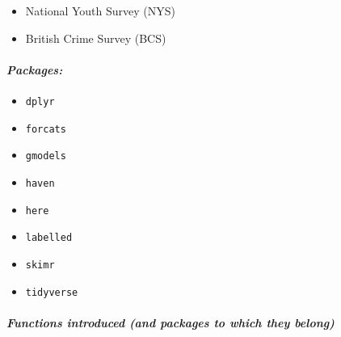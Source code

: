 \documentclass[
]{book}
\providecommand{\tightlist}{%
  \setlength{\itemsep}{0pt}\setlength{\parskip}{0pt}}
\begin{document}
\begin{itemize}
\tightlist
\item
  National Youth Survey (NYS)
\item
  British Crime Survey (BCS)
\end{itemize}

\hypertarget{packages-7}{%
\paragraph*{\texorpdfstring{\emph{Packages:}}{Packages:}}\label{packages-7}}

\begin{itemize}
\tightlist
\item
  \texttt{dplyr}
\item
  \texttt{forcats}
\item
  \texttt{gmodels}
\item
  \texttt{haven}
\item
  \texttt{here}
\item
  \texttt{labelled}
\item
  \texttt{skimr}
\item
  \texttt{tidyverse}
\end{itemize}

\hypertarget{functions-introduced-and-packages-to-which-they-belong-6}{%
\paragraph*{\texorpdfstring{\emph{Functions introduced (and packages to which they belong)}}{Functions introduced (and packages to which they belong)}}\label{functions-introduced-and-packages-to-which-they-belong-6}}
\end{document}
